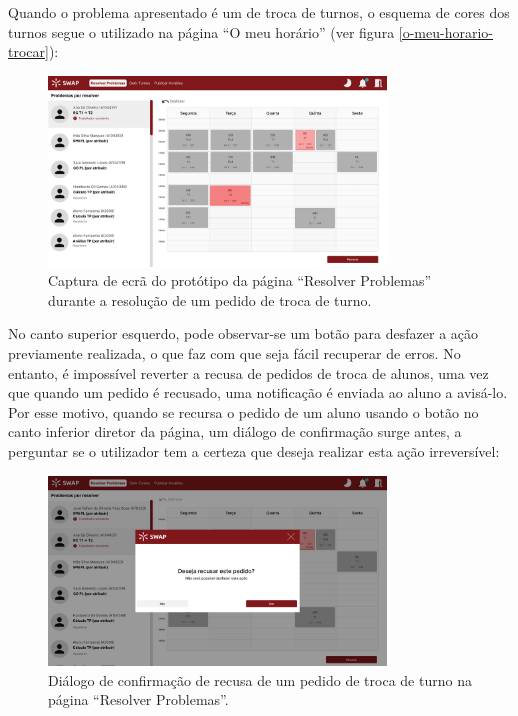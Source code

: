 \documentclass[12pt, a4paper]{article}
\begin{document}
Quando o problema apresentado é um de troca de turnos, o esquema de cores dos turnos segue o
utilizado na página ``O meu horário'' (ver figura \ref{o-meu-horario-trocar}):

\begin{figure}[H]
    \centering
    \includegraphics[width=0.8\textwidth]{res/prototype/resolver-problemas-pedido.png}
    \caption{
        \onehalfspacing
        Captura de ecrã do protótipo da página ``Resolver Problemas'' durante a resolução de um
        pedido de troca de turno.
    }
    \label{resolver-problemas-pedido}
\end{figure}

No canto superior esquerdo, pode observar-se um botão para desfazer a ação previamente realizada,
o que faz com que seja fácil recuperar de erros. No entanto, é impossível reverter a recusa de
pedidos de troca de alunos, uma vez que quando um pedido é recusado, uma notificação é enviada ao
aluno a avisá-lo. Por esse motivo, quando se recursa o pedido de um aluno usando o botão no canto
inferior diretor da página, um diálogo de confirmação surge antes, a perguntar se o utilizador tem
a certeza que deseja realizar esta ação irreversível:

\begin{figure}[H]
    \centering
    \includegraphics[width=0.8\textwidth]{res/prototype/dialogo-confirmacao-recusa.png}
    \caption{
        \onehalfspacing
        Diálogo de confirmação de recusa de um pedido de troca de turno na página
        ``Resolver Problemas''.
    }
    \label{dialogo-confirmacao-recusa}
\end{figure}
\end{document}
